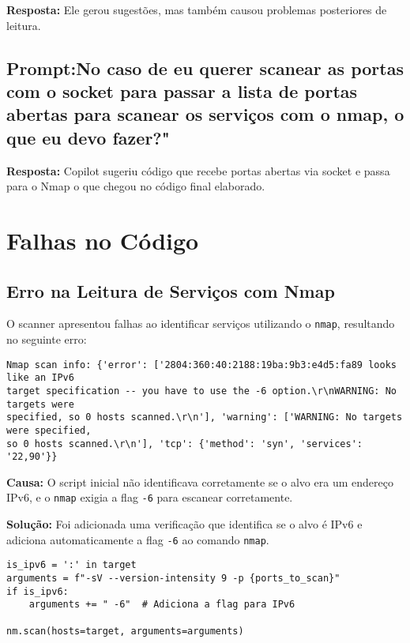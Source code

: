 \documentclass[12pt]{article}
\begin{document}
    \textbf{Resposta:}  Ele gerou sugestões, mas também causou problemas posteriores de leitura.

\subsection{\textbf{Prompt:}No caso de eu querer scanear as portas com o socket para passar a lista de portas abertas para scanear os serviços com o nmap, o que eu devo fazer?"}

    \textbf{Resposta:} Copilot sugeriu código que recebe portas abertas via socket e passa para o Nmap o que chegou no código final elaborado.


\section{Falhas no Código}

\subsection{Erro na Leitura de Serviços com Nmap}

O scanner apresentou falhas ao identificar serviços utilizando o \texttt{nmap}, resultando no seguinte erro:

\begin{lstlisting}
Nmap scan info: {'error': ['2804:360:40:2188:19ba:9b3:e4d5:fa89 looks like an IPv6 
target specification -- you have to use the -6 option.\r\nWARNING: No targets were 
specified, so 0 hosts scanned.\r\n'], 'warning': ['WARNING: No targets were specified, 
so 0 hosts scanned.\r\n'], 'tcp': {'method': 'syn', 'services': '22,90'}}
\end{lstlisting}

\textbf{Causa:} O script inicial não identificava corretamente se o alvo era um endereço IPv6, e o \texttt{nmap} exigia a flag \texttt{-6} para escanear corretamente.

\textbf{Solução:} Foi adicionada uma verificação que identifica se o alvo é IPv6 e adiciona automaticamente a flag \texttt{-6} ao comando \texttt{nmap}.

\begin{lstlisting}
is_ipv6 = ':' in target
arguments = f"-sV --version-intensity 9 -p {ports_to_scan}"
if is_ipv6:
    arguments += " -6"  # Adiciona a flag para IPv6

nm.scan(hosts=target, arguments=arguments)
\end{lstlisting}
\end{document}
